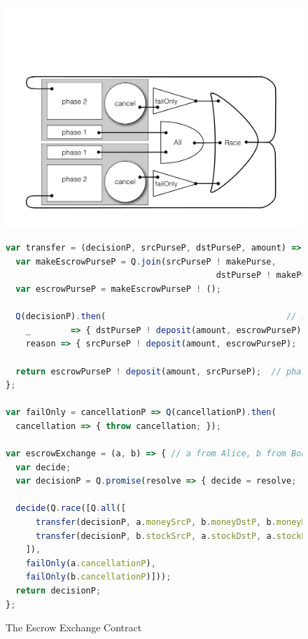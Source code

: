 \documentclass{llncs}
\begin{document}
\begin{figure}[htbp]
\begin{center}
\includegraphics[scale=0.3]{cyclic-circuit.pdf}
\end{center}
\begin{lstlisting}[language=javascript]
var transfer = (decisionP, srcPurseP, dstPurseP, amount) => {
  var makeEscrowPurseP = Q.join(srcPurseP ! makePurse, 
                                          dstPurseP ! makePurse);
  var escrowPurseP = makeEscrowPurseP ! ();

  Q(decisionP).then(                                    // setup phase 2
    _        => { dstPurseP ! deposit(amount, escrowPurseP); },
    reason => { srcPurseP ! deposit(amount, escrowPurseP); });
    
  return escrowPurseP ! deposit(amount, srcPurseP);  // phase 1
};

var failOnly = cancellationP => Q(cancellationP).then(
  cancellation => { throw cancellation; });

var escrowExchange = (a, b) => { // a from Alice, b from Bob
  var decide;
  var decisionP = Q.promise(resolve => { decide = resolve; });

  decide(Q.race([Q.all([
      transfer(decisionP, a.moneySrcP, b.moneyDstP, b.moneyNeeded),
      transfer(decisionP, b.stockSrcP, a.stockDstP, a.stockNeeded)
    ]), 
    failOnly(a.cancellationP), 
    failOnly(b.cancellationP)]));
  return decisionP;
};
\end{lstlisting}
\caption{The Escrow Exchange Contract}
\label{escrowExchange}
\end{figure}
\end{document}
